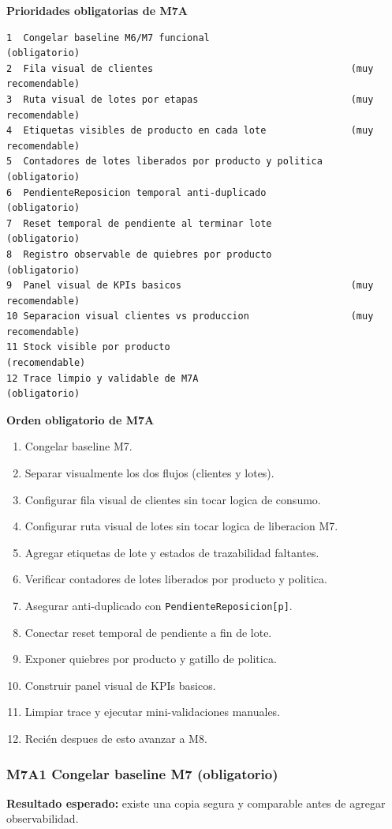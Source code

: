 \documentclass[11pt]{article}
\newcommand{\state}[1]{\texttt{#1}}
\begin{document}
\textbf{Prioridades obligatorias de M7A}
\begin{lstlisting}[caption={Backlog cerrado de M7A antes de M8/M10}]
1  Congelar baseline M6/M7 funcional                         (obligatorio)
2  Fila visual de clientes                                   (muy recomendable)
3  Ruta visual de lotes por etapas                           (muy recomendable)
4  Etiquetas visibles de producto en cada lote               (muy recomendable)
5  Contadores de lotes liberados por producto y politica     (obligatorio)
6  PendienteReposicion temporal anti-duplicado               (obligatorio)
7  Reset temporal de pendiente al terminar lote              (obligatorio)
8  Registro observable de quiebres por producto              (obligatorio)
9  Panel visual de KPIs basicos                              (muy recomendable)
10 Separacion visual clientes vs produccion                  (muy recomendable)
11 Stock visible por producto                                (recomendable)
12 Trace limpio y validable de M7A                           (obligatorio)
\end{lstlisting}

\textbf{Orden obligatorio de M7A}
\begin{enumerate}
  \item Congelar baseline M7.
  \item Separar visualmente los dos flujos (clientes y lotes).
  \item Configurar fila visual de clientes sin tocar logica de consumo.
  \item Configurar ruta visual de lotes sin tocar logica de liberacion M7.
  \item Agregar etiquetas de lote y estados de trazabilidad faltantes.
  \item Verificar contadores de lotes liberados por producto y politica.
  \item Asegurar anti-duplicado con \state{PendienteReposicion[p]}.
  \item Conectar reset temporal de pendiente a fin de lote.
  \item Exponer quiebres por producto y gatillo de politica.
  \item Construir panel visual de KPIs basicos.
  \item Limpiar trace y ejecutar mini-validaciones manuales.
  \item Recién despues de esto avanzar a M8.
\end{enumerate}

\subsubsection{M7A1 Congelar baseline M7 (obligatorio)}
\textbf{Resultado esperado:} existe una copia segura y comparable antes de agregar observabilidad.
\end{document}
